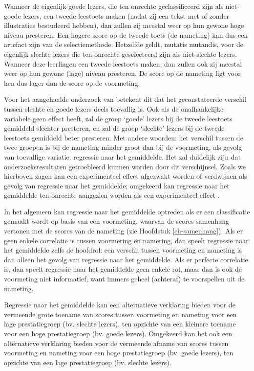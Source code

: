 \documentclass[
]{book}
\begin{document}
Wanneer de eigenlijk-goede lezers, die ten onrechte geclassificeerd zijn
als niet-goede lezers, een tweede leestoets maken (nadat zij een tekst
met of zonder illustraties bestudeerd hebben), dan zullen zij meestal
weer op hun gewone hoge niveau presteren. Een hogere score op de tweede
toets (de nameting) kan dus een artefact zijn van de selectiemethode.
Hetzelfde geldt, mutatis mutandis, voor de eigenlijk-slechte lezers die
ten onrechte geselecteerd zijn als niet-slechte lezers. Wanneer deze
leerlingen een tweede leestoets maken, dan zullen ook zij meestal weer
op hun gewone (lage) niveau presteren. De score op de nameting ligt voor
hen dus lager dan de score op de voormeting.

Voor het aangehaalde onderzoek van betekent dit dat het geconstateerde
verschil tussen slechte en goede lezers deels toevallig is. Ook als de
onafhankelijke variabele geen effect heeft, zal de groep `goede' lezers
bij de tweede leestoets gemiddeld slechter presteren, en zal de groep
`slechte' lezers bij de tweede leestoets gemiddeld beter presteren. Met
andere woorden: het verschil tussen de twee groepen is bij de nameting
minder groot dan bij de voormeting, als gevolg van toevallige variatie:
regressie naar het gemiddelde. Het zal duidelijk zijn dat
onderzoeksresultaten getroebleerd kunnen worden door dit verschijnsel.
Zoals we hierboven zagen kan een experimenteel effect afgezwakt worden
of verdwijnen als gevolg van regressie naar het gemiddelde; omgekeerd
kan regressie naar het gemiddelde ten onrechte aangezien worden als een
experimenteel effect \citep{RMP18}.

In het algemeen kan regressie naar het gemiddelde optreden als er een
classificatie gemaakt wordt op basis van een voormeting, waarvan de
scores samenhang vertonen met de scores van de nameting (zie
Hoofdstuk \ref{ch-samenhang}). Als er geen enkele correlatie is tussen
voormeting en nameting, dan speelt regressie naar het gemiddelde zelfs
de hoofdrol: een verschil tussen voormeting en nameting is dan alleen
het gevolg van regressie naar het gemiddelde. Als er perfecte correlatie
is, dan speelt regressie naar het gemiddelde geen enkele rol, maar dan
is ook de voormeting niet informatief, want immers geheel (achteraf) te
voorspellen uit de nameting.

Regressie naar het gemiddelde kan een alternatieve verklaring bieden
voor de vermeende grote toename van scores tussen voormeting en nameting
voor een lage prestatiegroep (bv. slechte lezers), ten opzichte van een
kleinere toename voor een hoge prestatiegroep (bv. goede lezers).
Omgekeerd kan het ook een alternatieve verklaring bieden voor de
vermeende afname van scores tussen voormeting en nameting voor een hoge
prestatiegroep (bv. goede lezers), ten opzichte van een lage
prestatiegroep (bv. slechte lezers).
\end{document}
